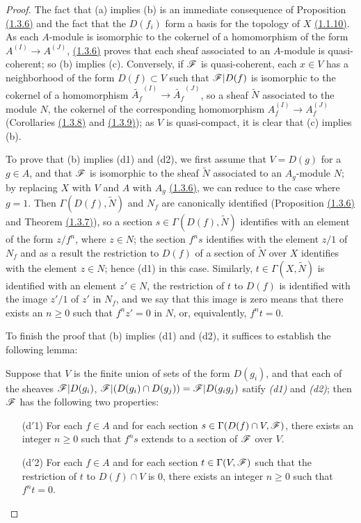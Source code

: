 \begin{proof}
\label{proof-thm-1.1.4.1}
The fact that (a) implies (b) is an immediate consequence of Proposition \hyperref[prop-1.1.3.6]{(1.3.6)} and the fact
that the $D(f_i)$ form a basis for the topology of $X$ \hyperref[prop-1.1.1.10]{(1.1.10)}. As each
$A$-module is isomorphic to the cokernel of a homomorphism of the form $A^{(I)}\to A^{(J)}$,
\hyperref[prop-1.1.3.6]{(1.3.6)} proves that each sheaf associated to an $A$-module is quasi-coherent; so
(b) implies (c). Conversely, if $\mathscr{F}$ is quasi-coherent, each $x\in V$ has a neighborhood
of the form $D(f)\subset V$ such that $\mathscr{F}|D(f)$ is isomorphic to the cokernel of a
homomorphism $\widetilde{A_f}^{(I)}\to\widetilde{A_f}^{(J)}$, so a sheaf $\widetilde{N}$
associated to the module $N$, the cokernel of the corresponding homomorphism
$A_f^{(I)}\to A_f^{(J)}$ (Corollaries \hyperref[cor-1.1.3.8]{(1.3.8)} and \hyperref[cor-1.1.3.9]{(1.3.9)}); as $V$ is quasi-compact,
it is clear that (c) implies (b).

To prove that (b) implies (d1) and (d2), we first assume that $V=D(g)$ for a $g\in A$, and
that $\mathscr{F}$ is isomorphic to the sheaf $\widetilde{N}$ associated to an $A_g$-module $N$;
by replacing $X$ with $V$ and $A$ with $A_g$ \hyperref[prop-1.1.3.6]{(1.3.6)}, we can reduce to the case
where $g=1$. Then $\Gamma(D(f),\widetilde{N})$ and $N_f$ are canonically identified
(Proposition \hyperref[prop-1.1.3.6]{(1.3.6)} and Theorem \hyperref[thm-1.1.3.7]{(1.3.7)}), so a section $s\in\Gamma(D(f),\widetilde{N})$
identifies with an element of the form $z/f^n$, where $z\in N$; the section $f^n s$ identifies
with the element $z/1$ of $N_f$ and as a result the restriction to $D(f)$ of a section of
$\widetilde{N}$ over $X$ identifies with the element $z\in N$; hence (d1) in this case.
Similarly, $t\in\Gamma(X,\widetilde{N})$ is identified with an element $z'\in N$, the
restriction of $t$ to $D(f)$ is identified with the image $z'/1$ of $z'$ in $N_f$, and we say
that this image is zero means that there exists an $n\geqslant 0$ such that $f^n z'=0$ in
$N$, or, equivalently, $f^n t=0$.

To finish the proof that (b) implies (d1) and (d2), it suffices to establish the following
lemma:
\begin{lem}[1.4.1.1]
\label{lem-1.1.4.1.1}
Suppose that $V$ is the finite union of sets of the form $D(g_i)$, and that each of the
sheaves $\mathscr{F}|D(g_i)$, $\mathscr{F}|(D(g_i)\cap D(g_j))=\mathscr{F}|D(g_i g_j)$ satify {\em (d1)}
and {\em (d2)}; then $\mathscr{F}$ has the following two properties:
\begin{itemize}
  \item[{\rm(d$'$1)}] For each $f\in A$ and for each section $s\in\Gamma(D(f)\cap V,\mathscr{F})$, there exists
    an integer $n\geqslant 0$ such that $f^n s$ extends to a section of $\mathscr{F}$ over $V$.
  \item[{\rm(d$'$2)}] For each $f\in A$ and for each section $t\in\Gamma(V,\mathscr{F})$ such that the
    restriction of $t$ to $D(f)\cap V$ is $0$, there exists an integer $n\geqslant 0$ such that $f^n t=0$.
\end{itemize}
\end{lem}


\end{proof}
